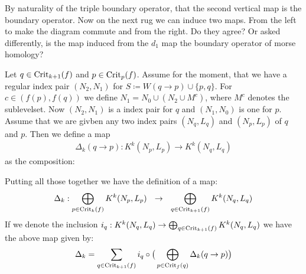 \begin{cor}
\begin{center}
\end{center}
By naturality of the triple boundary operator, that the second vertical map is the boundary operator. Now on the next rug we can induce two maps. From the left to make the diagram commute and from the right. Do they agree? Or asked differently, is the map induced from the $d_1$ map the boundary operator of morse homology?
\end{cor}


\begin{definition}
    Let $q\in \mathrm{Crit}_{k+1}(f)$ and $p\in \mathrm{Crit}_p(f)$. Assume for the moment, that we have a regular index pair $(N_2,N_1)$ for $S\coloneq W(q\to p)\cup \{p,q\}$. For $c\in (f(p),f(q))$ we define $N_1=N_0\cup (N_2\cup M^c)$, where $M^c$ denotes the sublevelset. Now $(N_2,N_1)$ is a index pair for $q$ and $(N_1,N_0)$ is one for $p$. Assume that we are givben any two index pairs $(N_q,L_q)$ and $(N_p,L_p)$ of $q $ and $p$. Then we define a map
    \begin{align*}
        \Delta_k(q\to p): K^k(N_p,L_p)\to K^k(N_q,L_q)
    \end{align*} as the composition:
    \begin{center}
    \end{center} 
Putting all those together we have the definition of a map:
\begin{align*}
    \Delta_k: \bigoplus_{p\in \mathrm{Crit}_k(f)}K^k(N_p,L_p) ~~\to ~~  \bigoplus_{q\in \mathrm{Crit}_{k+1}(f)}K^k(N_q,L_q)
\end{align*} If we denote the inclusion $i_q:K^k(N_q,L_q)\rightarrow \bigoplus_{q\in \mathrm{Crit}_{k+1}(f)}K^k(N_q,L_q)$ we have the above map given by: 
\begin{align*}
    \Delta_k=\sum_{q\in \mathrm{Crit}_{k+1}(f)} i_q\circ \big( \bigoplus_{p \in \mathrm{Crit}_f(q)} \Delta_k(q\to p) \big)
\end{align*}
\end{definition}

